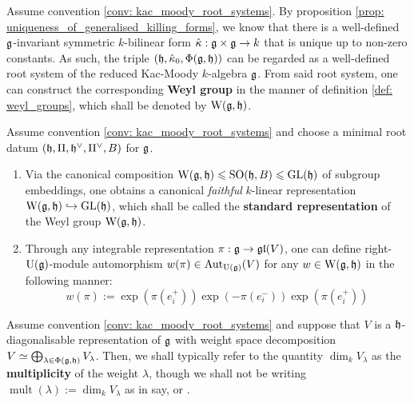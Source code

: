             \begin{definition} \label{def: weyl_groups_of_tame_kac_moody_algebras}
                Assume convention \ref{conv: kac_moody_root_systems}. By proposition \ref{prop: uniqueness_of_generalised_killing_forms}, we know that there is a well-defined $\mathfrak{g}$-invariant symmetric $k$-bilinear form $\hat{\kappa}: \g \x \g \to k$ that is unique up to non-zero constants. As such, the triple $(\mathfrak{h}, \hat{\kappa}_0, \Phi(\mathfrak{g}, \mathfrak{h}))$ can be regarded as a well-defined root system of the reduced Kac-Moody $k$-algebra $\mathfrak{g}$. From said root system, one can construct the corresponding \textbf{Weyl group} in the manner of definition \ref{def: weyl_groups}, which shall be denoted by $\mathrm{W}(\mathfrak{g}, \mathfrak{h})$.
            \end{definition}
            \begin{definition} \label{def: standard_representations_of_weyl_groups}
                Assume convention \ref{conv: kac_moody_root_systems} and choose a minimal root datum $(\mathfrak{h}, \Pi, \mathfrak{h}^{\vee}, \Pi^{\vee}, B)$ for $\mathfrak{g}$. 
                    \begin{enumerate}
                        \item Via the canonical composition $\mathrm{W}(\mathfrak{g}, \mathfrak{h}) \leqslant \mathrm{SO}(\mathfrak{h}, B) \leqslant \mathrm{GL}(\mathfrak{h})$ of subgroup embeddings, one obtains a canonical \textit{faithful} $k$-linear representation $\mathrm{W}(\mathfrak{g}, \mathfrak{h}) \hookrightarrow \mathrm{GL}(\mathfrak{h})$, which shall be called the \textbf{standard representation} of the Weyl group $\mathrm{W}(\mathfrak{g}, \mathfrak{h})$.
                        \item Through any integrable representation $\pi: \mathfrak{g} \to \mathfrak{gl}(V)$, one can define right-$\mathrm{U}(\mathfrak{g})$-module automorphism $w(\pi) \in \mathrm{Aut}_{\mathrm{U}(\mathfrak{g})}(V)$ for any $w \in \mathrm{W}(\mathfrak{g}, \mathfrak{h})$ in the following manner:
                            $$w(\pi) := \exp(\pi(e_i^+)) \exp(-\pi(e_i^-)) \exp(\pi(e_i^+))$$
                    \end{enumerate}
            \end{definition}
            \begin{convention} \label{conv: weight_multiplicites}
                Assume convention \ref{conv: kac_moody_root_systems} and suppose that $V $ is a $\mathfrak{h}$-diagonalisable representation of $\mathfrak{g}$ with weight space decomposition $V \simeq \bigoplus_{\lambda \in \Phi(\mathfrak{g}, \mathfrak{h})} V_{\lambda}$. Then, we shall typically refer to the quantity $\dim_k V_{\lambda}$ as the \textbf{multiplicity} of the weight $\lambda$, though we shall not be writing $\operatorname{mult}(\lambda) := \dim_k V_{\lambda}$ as in say, \cite[Chapter 3]{kac_infinite_dimensional_lie_algebras} or \cite[Chapter 5]{perrin_kac_moody_algebras}.
            \end{convention}
